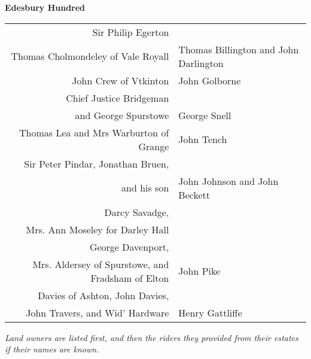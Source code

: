 \pagebreak

\vspace*{30mm}

\begin{center}
  \Large
  \textbf{Edesbury Hundred}
\end{center}

\begin{center}
  \small
  \begin{tabular}{rl}
    Sir Philip Egerton & \dotfill \\
    Thomas Cholmondeley of Vale Royall & Thomas Billington and John Darlington \\
    John Crew of Vtkinton & John Golborne \\
    Chief Justice Bridgeman \\ and George Spurstowe & George Snell \\
    Thomas Lea and Mrs Warburton of Grange & John Tench \\
    Sir Peter Pindar, Jonathan Bruen, \\ and his son & John Johnson and John Beckett \\
    Darcy Savadge, \\ Mrs. Ann Moseley for Darley Hall & \dotfill \\
    George Davenport, \\ Mrs. Aldersey of Spurstowe, and Fradsham of Elton & John Pike \\
    Davies of Ashton, John Davies, \\ John Travers, and Wid' Hardware & Henry Gattliffe \\
  \end{tabular}
\end{center}

\vfill

\begin{center}
  \noindent
  \it
  \small
  Land owners are listed first, and then the riders they provided from their estates if their names are known.
\end{center}
